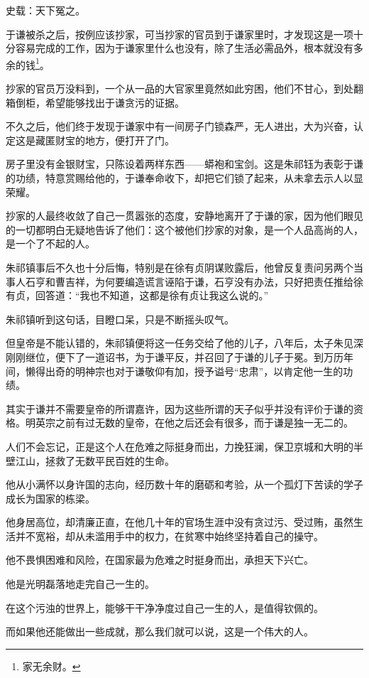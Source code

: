 \begin{multicols}{\theparacolNo}
		史载：天下冤之。

		于谦被杀之后，按例应该抄家，可当抄家的官员到于谦家里时，才发现这是一项十分容易完成的工作，因为于谦家里什么也没有，除了生活必需品外，根本就没有多余的钱\footnote{家无余财。}。

		抄家的官员万没料到，一个从一品的大官家里竟然如此穷困，他们不甘心，到处翻箱倒柜，希望能够找出于谦贪污的证据。

		不久之后，他们终于发现于谦家中有一间房子门锁森严，无人进出，大为兴奋，认定这是藏匿财宝的地方，便打开了门。

		房子里没有金银财宝，只陈设着两样东西——蟒袍和宝剑。这是朱祁钰为表彰于谦的功绩，特意赏赐给他的，于谦奉命收下，却把它们锁了起来，从未拿去示人以显荣耀。

		抄家的人最终收敛了自己一贯嚣张的态度，安静地离开了于谦的家，因为他们眼见的一切都明白无疑地告诉了他们：这个被他们抄家的对象，是一个人品高尚的人，是一个了不起的人。

		朱祁镇事后不久也十分后悔，特别是在徐有贞阴谋败露后，他曾反复责问另两个当事人石亨和曹吉祥，为何要编造谎言诬陷于谦，石亨没有办法，只好把责任推给徐有贞，回答道：“我也不知道，这都是徐有贞让我这么说的。”

		朱祁镇听到这句话，目瞪口呆，只是不断摇头叹气。

		但皇帝是不能认错的，朱祁镇便将这一任务交给了他的儿子，八年后，太子朱见深刚刚继位，便下了一道诏书，为于谦平反，并召回了于谦的儿子于冕。到万历年间，懒得出奇的明神宗也对于谦敬仰有加，授予谥号“忠肃”，以肯定他一生的功绩。

		其实于谦并不需要皇帝的所谓嘉许，因为这些所谓的天子似乎并没有评价于谦的资格。明英宗之前有过无数的皇帝，在他之后还会有很多，而于谦是独一无二的。

		人们不会忘记，正是这个人在危难之际挺身而出，力挽狂澜，保卫京城和大明的半壁江山，拯救了无数平民百姓的生命。

		他从小满怀以身许国的志向，经历数十年的磨砺和考验，从一个孤灯下苦读的学子成长为国家的栋梁。

		他身居高位，却清廉正直，在他几十年的官场生涯中没有贪过污、受过贿，虽然生活并不宽裕，却从未滥用手中的权力，在贫寒中始终坚持着自己的操守。

		他不畏惧困难和风险，在国家最为危难之时挺身而出，承担天下兴亡。

		他是光明磊落地走完自己一生的。

		在这个污浊的世界上，能够干干净净度过自己一生的人，是值得钦佩的。

		而如果他还能做出一些成就，那么我们就可以说，这是一个伟大的人。


\end{multicols}

